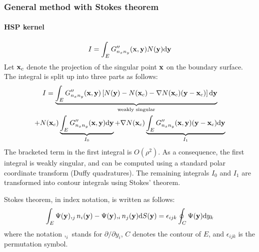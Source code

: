 \subsubsection{General method with Stokes theorem}

\paragraph{HSP kernel}

\begin{equation}
	I = \int_E G''_{n_x n_y}({\bf x}, {\bf y}) N({\bf y}) \mathrm{d} {\bf y}
\end{equation}
%
Let ${\bf x}_c$ denote the projection of the singular point ${\bf x}$ on the boundary surface.
The integral is split up into three parts as follows:
%
\begin{multline}
	I = \underbrace{\int_E G''_{n_x n_y}({\bf x}, {\bf y})
	\left[ N({\bf y}) - N({\bf x}_c) - \nabla N({\bf x}_c) ({\bf y} - {\bf x}_c)\right]
	\mathrm{d} {\bf y}}_{\text{weakly singular}} \\
	+
	N({\bf x}_c)
	\underbrace{\int_E G''_{n_x n_y}({\bf x}, {\bf y})
	\mathrm{d} {\bf y}}_{I_0}
	+
	\nabla N({\bf x}_c)
	\underbrace{\int_E G''_{n_x n_y}({\bf x}, {\bf y})
	({\bf y} - {\bf x}_c)
	\mathrm{d} {\bf y}}_{I_1}
\end{multline}
%
The bracketed term in the first integral is $O(\rho^2)$.
As a consequence, the first integral is weakly singular, and can be computed using a standard polar coordinate transform (Duffy quadratures).
The remaining integrals $I_0$ and $I_1$ are transformed into contour integrals using Stokes' theorem.

Stokes theorem, in index notation, is written as follows:
%
\begin{equation}
	\int_E \Psi({\bf y}),_j n_i({\bf y}) - \Psi({\bf y}),_i n_j({\bf y}) \mathrm{d} S({\bf y}) = \epsilon_{ijk} \oint_C \Psi({\bf y}) \mathrm{d} y_k
\end{equation}
%
where the notation $,_i$ stands for $\partial/\partial y_i$, $C$ denotes the contour of $E$, and $\epsilon_{ijk}$ is the permutation symbol.

